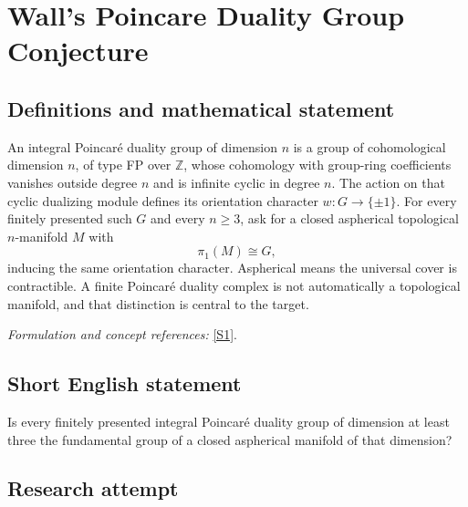\documentclass[11pt,a4paper]{article}
\newcommand{\Z}{\mathbb{Z}}
\newcommand{\sref}[2]{\hyperlink{source:#1:#2}{[S#2]}}
\newif\ifshowcatalogue
\newcommand{\cataloguescope}[1]{\ifshowcatalogue
 \paragraph{Exact scope in the supplied catalogue.}
 \begin{quote}\small #1\end{quote}\fi}
\numberwithin{equation}{section}
\begin{document}
\setcounter{section}{0}
\clearpage
\section*{\texorpdfstring{Wall's Poincare Duality Group Conjecture}{Wall's Poincare Duality Group Conjecture}}\label{30006797}
\subsection{Definitions and mathematical statement}
An integral Poincar\'e duality group of dimension $n$ is a group of cohomological dimension $n$, of type FP over $\Z$, whose cohomology with group-ring coefficients vanishes outside degree $n$ and is infinite cyclic in degree $n$. The action on that cyclic dualizing module defines its orientation character $w:G\to\{\pm1\}$. For every finitely presented such $G$ and every $n\ge3$, ask for a closed aspherical topological $n$-manifold $M$ with
\[
 \pi_1(M)\cong G,
\]
inducing the same orientation character. Aspherical means the universal cover is contractible. A finite Poincar\'e duality complex is not automatically a topological manifold, and that distinction is central to the target.
\par\smallskip\textit{Formulation and concept references:} \sref{30006797}{1}.
\cataloguescope{For every n\ensuremath{\ge}3 and every finitely presented integral Poincaré duality group G of dimension n, prove that there is a closed aspherical topological n-manifold M with \ensuremath{\pi}1(M)\ensuremath{\cong}G and matching orientation character.}
\subsection{Short English statement}
Is every finitely presented integral Poincaré duality group of dimension at least three the fundamental group of a closed aspherical manifold of that dimension?
\subsection{Research attempt}
\end{document}
